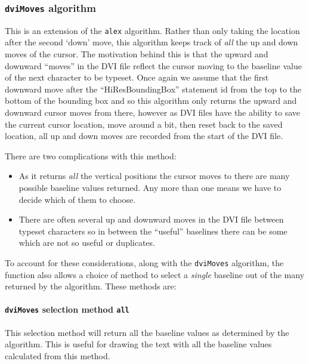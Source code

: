 \documentclass[]{article}
\let\oldparagraph\paragraph
\renewcommand{\paragraph}[1]{\oldparagraph{#1}\mbox{}}
\begin{document}
\subsubsection{\texorpdfstring{\texttt{dviMoves}
algorithm}{dviMoves algorithm}}\label{dvimoves-algorithm}

This is an extension of the \texttt{alex} algorithm. Rather than only
taking the location after the second `down' move, this algorithm keeps
track of \emph{all} the up and down moves of the cursor. The motivation
behind this is that the upward and downward ``moves'' in the DVI file
reflect the cursor moving to the baseline value of the next character to
be typeset. Once again we assume that the first downward move after the
``HiResBoundingBox'' statement id from the top to the bottom of the
bounding box and so this algorithm only returns the upward and downward
cursor moves from there, however as DVI files have the ability to save
the current cursor location, move around a bit, then reset back to the
saved location, all up and down moves are recorded from the start of the
DVI file.

There are two complications with this method:

\begin{itemize}
\item
  As it returns \emph{all} the vertical positions the cursor moves to
  there are many possible baseline values returned. Any more than one
  means we have to decide which of them to choose.
\item
  There are often several up and downward moves in the DVI file between
  typeset characters so in between the ``useful'' baselines there can be
  some which are not so useful or duplicates.
\end{itemize}

To account for these considerations, along with the \texttt{dviMoves}
algorithm, the function also allows a choice of method to select a
\emph{single} baseline out of the many returned by the algorithm. These
methods are:

\paragraph{\texorpdfstring{\texttt{dviMoves} selection method
\texttt{all}}{dviMoves selection method all}}\label{dvimoves-selection-method-all}

This selection method will return all the baseline values as determined
by the algorithm. This is useful for drawing the text with all the
baseline values calculated from this method.
\end{document}
